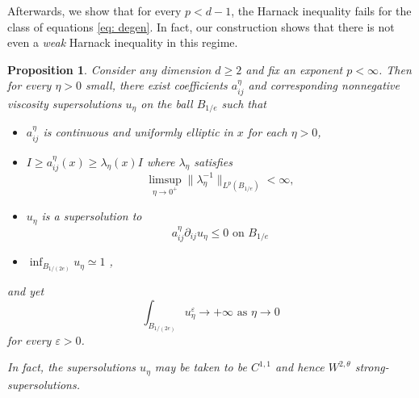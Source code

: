 \documentclass[reqno]{amsart}
\numberwithin{equation}{section}
\newtheorem{prop}[thm]{Proposition}
\numberwithin{equation}{section}
\newcommand{\eps}{\varepsilon}
\newcommand{\ds}{\displaystyle}
\begin{document}
Afterwards, we show that for every $p<d-1$, the Harnack inequality fails for the class of equations \eqref{eq: degen}. In fact, our construction shows that there is not even a \textit{weak} Harnack inequality in this regime.
\begin{prop}
\label{prop: noLeps}
Consider any dimension $d \ge 2$ and fix an exponent $p<\infty$. Then for every $\eta>0$ small, there exist  coefficients $a_{ij}^\eta$ and corresponding nonnegative viscosity supersolutions $u_\eta$ on the ball $B_{1/e}$ such that 
\begin{itemize}
\item $a_{ij}^\eta$ is continuous and uniformly elliptic in $x$ for each $\eta>0$,
\item $I \ge a_{ij}^\eta(x) \ge \lambda_\eta(x)  I$ where $\lambda_\eta$ satisfies 
$$\limsup_{\eta \to 0^+} \|\lambda_\eta^{-1}\|_{L^p(B_{1/e})}  <\infty,$$
\item $u_\eta$ is a supersolution to 
$$a_{ij}^\eta\partial_{ij}u_\eta \le 0 \text{ on } B_{1/e}$$
\item  $\ds \inf_{B_{1/(2e)}} u_\eta \simeq 1$ ,
\end{itemize}
and yet
$$\int_{B_{1/(2e)}} u_\eta^\eps \to +\infty \text{ as } \eta \to 0$$
for every $\eps>0$.

In fact, the supersolutions $u_\eta$ may be taken to be $C^{1,1}$ and hence $W^{2,\theta}$ strong-supersolutions.
\end{prop}
\end{document}
